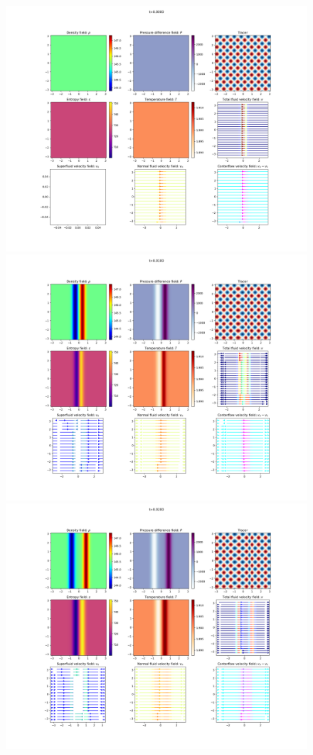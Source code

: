 \documentclass{article}
\begin{document}
\begin{figure}[h]
    \includegraphics[width=\textwidth/3]{Sim 1/SF01_0000.png}
    \includegraphics[width=\textwidth/3]{Sim 1/SF01_0020.png}
    \includegraphics[width=\textwidth/3]{Sim 1/SF01_0040.png}

\end{figure}
\end{document}
